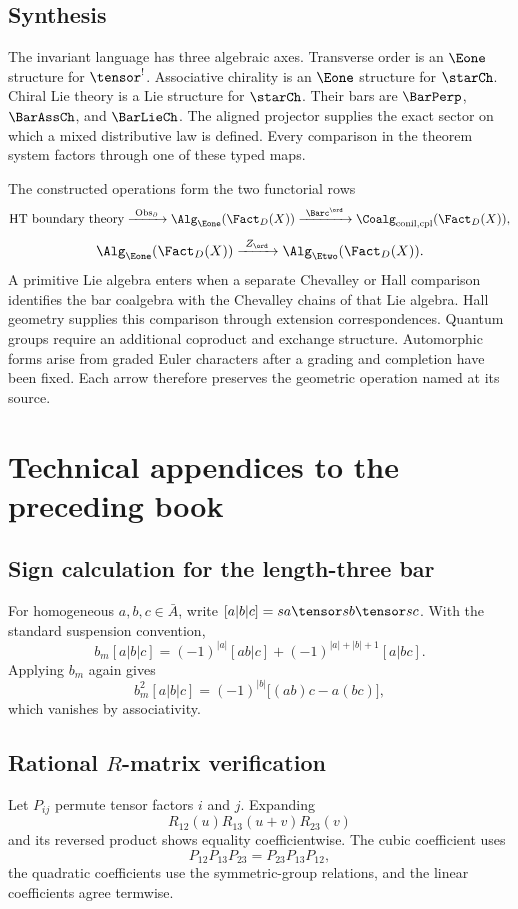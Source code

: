 \chapter{Synthesis}
The invariant language has three algebraic axes.  Transverse order is an $\Eone$ structure for $\tensor^!$.  Associative chirality is an $\Eone$ structure for $\starCh$.  Chiral Lie theory is a Lie structure for $\starCh$.  Their bars are $\BarPerp$, $\BarAssCh$, and $\BarLieCh$.  The aligned projector supplies the exact sector on which a mixed distributive law is defined.  Every comparison in the theorem system factors through one of these typed maps.

The constructed operations form the two functorial rows
\[
 \text{HT boundary theory}
 \xrightarrow{\ \mathrm{Obs}_{\partial}\ }
 \Alg_{\Eone}(\Fact_D(X))
 \xrightarrow{\ \Barc^{\ord}\ }
 \Coalg_{\mathrm{conil,cpl}}(\Fact_D(X)),
\]
\[
 \Alg_{\Eone}(\Fact_D(X))
 \xrightarrow{\ Z_{\ord}\ }
 \Alg_{\Etwo}(\Fact_D(X)).
\]
A primitive Lie algebra enters when a separate Chevalley or Hall comparison identifies the bar coalgebra with the Chevalley chains of that Lie algebra. Hall geometry supplies this comparison through extension correspondences. Quantum groups require an additional coproduct and exchange structure. Automorphic forms arise from graded Euler characters after a grading and completion have been fixed. Each arrow therefore preserves the geometric operation named at its source.

\part{Technical appendices to the preceding book}
\chapter{Sign calculation for the length-three bar}
For homogeneous $a,b,c\in\bar A$, write $[a|b|c]=sa\tensor sb\tensor sc$. With the standard suspension convention,
\[
 b_m[a|b|c]
 =(-1)^{|a|}[ab|c]
 +(-1)^{|a|+|b|+1}[a|bc].
\]
Applying $b_m$ again gives
\[
 b_m^2[a|b|c]
 =(-1)^{|b|}\bigl[(ab)c-a(bc)\bigr],
\]
which vanishes by associativity.

\chapter{Rational \texorpdfstring{$R$}{R}-matrix verification}
Let $P_{ij}$ permute tensor factors $i$ and $j$. Expanding
\[
 R_{12}(u)R_{13}(u+v)R_{23}(v)
\]
and its reversed product shows equality coefficientwise. The cubic coefficient uses
\[
 P_{12}P_{13}P_{23}=P_{23}P_{13}P_{12},
\]
the quadratic coefficients use the symmetric-group relations, and the linear coefficients agree termwise.

